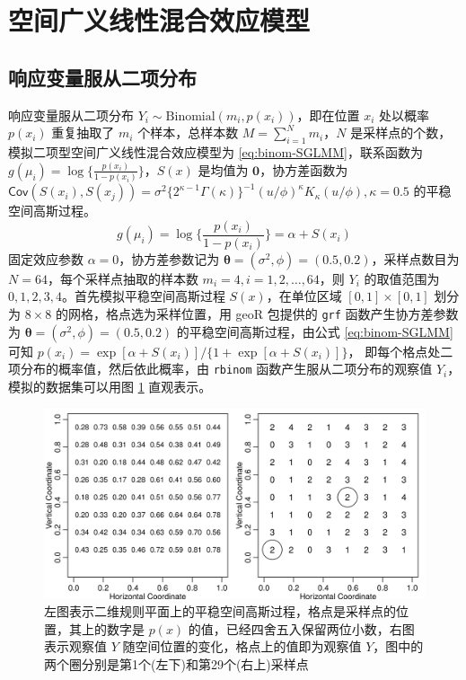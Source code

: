 \documentclass[12pt,a4paper,UTF8,twoside]{book}
\theoremstyle{definition}
\theoremstyle{definition}
\theoremstyle{definition}
\theoremstyle{remark}
\begin{document}
\hypertarget{sim-sglmm}{%
\section{空间广义线性混合效应模型}\label{sim-sglmm}}

\hypertarget{sim-binomal-sglmm}{%
\subsection{响应变量服从二项分布}\label{sim-binomal-sglmm}}

响应变量服从二项分布
\(Y_{i} \sim \mathrm{Binomial}(m_{i},p(x_{i}))\)，即在位置 \(x_i\)
处以概率 \(p(x_i)\) 重复抽取了 \(m_i\) 个样本，总样本数
\(M=\sum_{i=1}^{N}m_i\)，\(N\)
是采样点的个数，模拟二项型空间广义线性混合效应模型为
\eqref{eq:binom-SGLMM}，联系函数为
\(g(\mu_i) = \log\{\frac{p(x_i)}{1-p(x_i)}\}\)，\(S(x)\) 是均值为
\(\mathbf{0}\)，协方差函数为
\(\mathsf{Cov}(S(x_i),S(x_j)) = \sigma^2 \big\{2^{\kappa-1}\Gamma(\kappa)\big\}^{-1}(u/\phi)^{\kappa}K_{\kappa}(u/\phi), \kappa = 0.5\)
的平稳空间高斯过程。 \begin{equation}
g(\mu_i) = \log\big\{\frac{p(x_i)}{1-p(x_i)}\big\} = \alpha + S(x_i) \label{eq:binom-SGLMM}
\end{equation} 固定效应参数 \(\alpha = 0\)，协方差参数记为
\(\boldsymbol{\theta} = (\sigma^2, \phi) = (0.5, 0.2)\)，采样点数目为
\(N = 64\)，每个采样点抽取的样本数 \(m_i = 4, i = 1, 2, \ldots, 64\)，则
\(Y_i\) 的取值范围为 \(0, 1, 2, 3, 4\)。首先模拟平稳空间高斯过程
\(S(x)\)，在单位区域 \([0,1] \times [0,1]\) 划分为 \(8 \times 8\)
的网格，格点选为采样位置，用 geoR 包提供的 \texttt{grf}
函数产生协方差参数为
\(\boldsymbol{\theta} = (\sigma^2,\phi) = (0.5, 0.2)\)
的平稳空间高斯过程，由公式 \eqref{eq:binom-SGLMM} 可知
\(p(x_i) = \exp[\alpha + S(x_i)]/\{1 + \exp[\alpha + S(x_i)]\}\)，
即每个格点处二项分布的概率值，然后依此概率，由 \texttt{rbinom}
函数产生服从二项分布的观察值 \(Y_i\)，模拟的数据集可以用图
\ref{fig:binom-without-nugget-geoRglm} 直观表示。

\begin{figure}

{\centering \includegraphics[width=0.9\linewidth]{figures/binom-without-nugget-geoRglm} 

}

\caption{左图表示二维规则平面上的平稳空间高斯过程，格点是采样点的位置，其上的数字是 $p(x)$ 的值，已经四舍五入保留两位小数，右图表示观察值 $Y$ 随空间位置的变化，格点上的值即为观察值 $Y$，图中的两个圈分别是第1个(左下)和第29个(右上)采样点}\label{fig:binom-without-nugget-geoRglm}
\end{figure}
\end{document}

